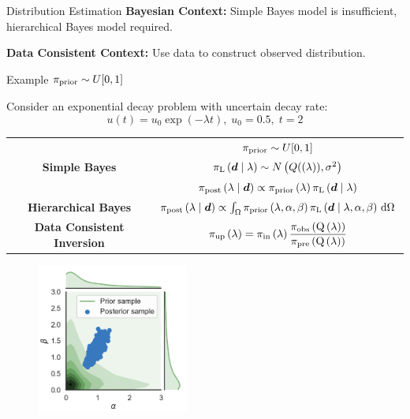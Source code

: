 \begin{block}{Distribution Estimation}
\centering
            {\large \textbf{Bayesian Context:} Simple Bayes model is insufficient, hierarchical Bayes model required.}
           
           {\large \textbf{Data Consistent Context:} Use data to construct observed distribution.}

             
\end{block}


\begin{block}{Example}
\centering
$\begin{aligned}\prior\sim U[0,1]\end{aligned}$

Consider an exponential decay problem with uncertain decay rate:
\begin{equation*}
       u(t) = u_0\exp(-\lambda t), \; u_0 = 0.5 ,\; t=2
   \end{equation*}

\begin{tabular}{cc}
\multirow{3}{*}{\textbf{Simple Bayes}} & 
$\prior\sim U[0,1]$ \\
& $\likelihood\qGivelam \sim N\left(Q(\lam),\sigma^2\right)$ \\
                                        & $\bayes$ \\[2ex]
\textbf{Hierarchical Bayes} & $\Hbayes$\\
\textbf{Data Consistent \vspace{1cm} Inversion} & $\dci$ \\
\end{tabular}

\begin{figure}
        \includegraphics[width=5cm]{figures/distr_EX_hyper_param.png}
        \vspace{-0.5cm}
        \caption{ }
\end{figure}


\end{block}
